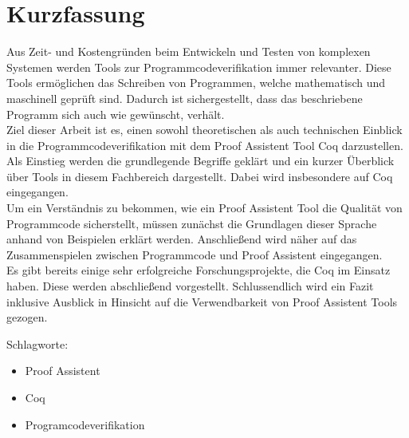 \section*{Kurzfassung}
\thispagestyle{empty}


Aus Zeit- und Kostengründen beim Entwickeln und Testen von komplexen Systemen werden Tools zur Programmcodeverifikation immer relevanter.
Diese Tools ermöglichen das Schreiben von Programmen, welche mathematisch und maschinell geprüft sind. Dadurch ist sichergestellt, dass das beschriebene Programm sich auch wie gewünscht, verhält.\\
Ziel dieser Arbeit ist es, einen sowohl theoretischen als auch technischen Einblick in die Programmcodeverifikation mit dem Proof Assistent Tool Coq darzustellen.
Als Einstieg werden die grundlegende Begriffe geklärt und ein kurzer Überblick über Tools in diesem Fachbereich dargestellt. Dabei wird insbesondere auf Coq eingegangen.\\
Um ein Verständnis zu bekommen, wie ein Proof Assistent Tool die Qualität von Programmcode sicherstellt, müssen zunächst die Grundlagen dieser Sprache anhand von Beispielen erklärt werden. Anschließend wird näher auf das Zusammenspielen zwischen Programmcode und Proof Assistent eingegangen.\\
Es gibt bereits einige sehr erfolgreiche Forschungsprojekte, die Coq im Einsatz haben. Diese werden abschließend vorgestellt. Schlussendlich wird ein Fazit inklusive Ausblick in Hinsicht auf die Verwendbarkeit von Proof Assistent Tools gezogen.
\bigskip

\noindent
Schlagworte:
\begin{itemize}
	\item Proof Assistent
	\item Coq
	\item Programcodeverifikation
\end{itemize}


